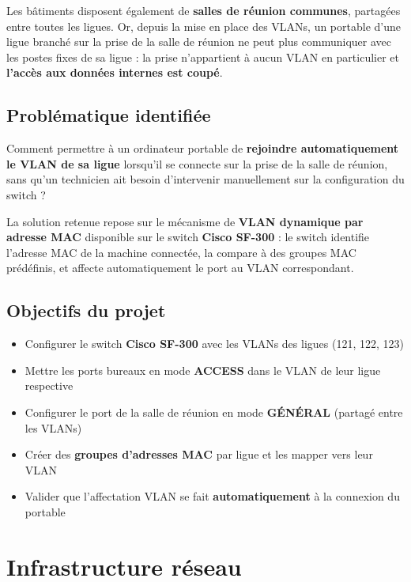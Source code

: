 \documentclass[a4paper,12pt]{article}
\begin{document}
Les bâtiments disposent également de \textbf{salles de réunion communes}, partagées entre
toutes les ligues. Or, depuis la mise en place des VLANs, un portable d'une ligue branché
sur la prise de la salle de réunion ne peut plus communiquer avec les postes fixes de sa ligue :
la prise n'appartient à aucun VLAN en particulier et \textbf{l'accès aux données internes est coupé}.

\subsection{Problématique identifiée}

Comment permettre à un ordinateur portable de \textbf{rejoindre automatiquement le VLAN de sa ligue}
lorsqu'il se connecte sur la prise de la salle de réunion, sans qu'un technicien ait besoin
d'intervenir manuellement sur la configuration du switch ?

La solution retenue repose sur le mécanisme de \textbf{VLAN dynamique par adresse MAC} disponible
sur le switch \textbf{Cisco SF-300} : le switch identifie l'adresse MAC de la machine connectée,
la compare à des groupes MAC prédéfinis, et affecte automatiquement le port au VLAN correspondant.

\subsection{Objectifs du projet}

\begin{itemize}
  \item Configurer le switch \textbf{Cisco SF-300} avec les VLANs des ligues (121, 122, 123)
  \item Mettre les ports bureaux en mode \textbf{ACCESS} dans le VLAN de leur ligue respective
  \item Configurer le port de la salle de réunion en mode \textbf{GÉNÉRAL} (partagé entre les VLANs)
  \item Créer des \textbf{groupes d'adresses MAC} par ligue et les mapper vers leur VLAN
  \item Valider que l'affectation VLAN se fait \textbf{automatiquement} à la connexion du portable
\end{itemize}

\section{Infrastructure réseau}
\end{document}
